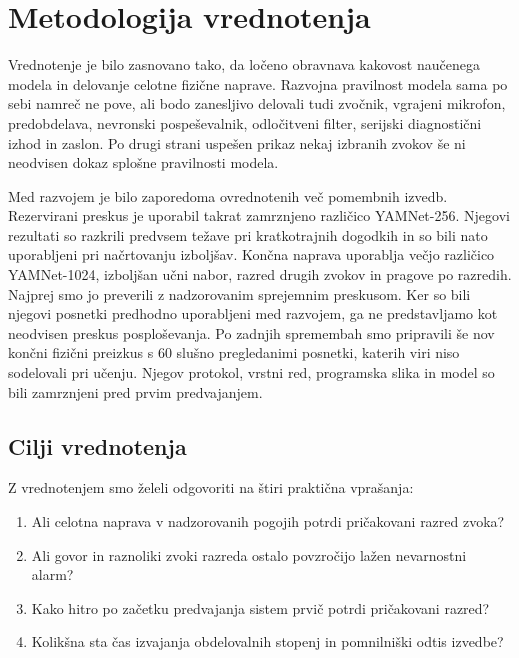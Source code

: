 \chapter{Metodologija vrednotenja}
\label{ch:metodologija}

Vrednotenje je bilo zasnovano tako, da ločeno obravnava kakovost naučenega
modela in delovanje celotne fizične naprave. Razvojna pravilnost modela sama po
sebi namreč ne pove, ali bodo zanesljivo delovali tudi zvočnik, vgrajeni
mikrofon, predobdelava, nevronski pospeševalnik, odločitveni filter, serijski
diagnostični izhod in zaslon. Po drugi strani uspešen prikaz nekaj izbranih
zvokov še ni neodvisen dokaz splošne pravilnosti modela.

Med razvojem je bilo zaporedoma ovrednotenih več pomembnih izvedb. Rezervirani
preskus je uporabil takrat zamrznjeno različico YAMNet-256. Njegovi
rezultati so razkrili predvsem težave pri kratkotrajnih dogodkih in so bili nato
uporabljeni pri načrtovanju izboljšav. Končna naprava uporablja večjo različico
YAMNet-1024, izboljšan učni nabor, razred drugih zvokov in pragove po razredih.
Najprej smo jo preverili z nadzorovanim sprejemnim preskusom. Ker so bili
njegovi posnetki predhodno uporabljeni med razvojem, ga ne predstavljamo kot
neodvisen preskus posploševanja. Po zadnjih spremembah smo pripravili še nov
končni fizični preizkus s 60 slušno pregledanimi posnetki, katerih viri niso
sodelovali pri učenju. Njegov protokol, vrstni red, programska slika in model
so bili zamrznjeni pred prvim predvajanjem.

\section{Cilji vrednotenja}

Z vrednotenjem smo želeli odgovoriti na štiri praktična vprašanja:

\begin{enumerate}
  \item Ali celotna naprava v nadzorovanih pogojih potrdi pričakovani razred
        zvoka?
  \item Ali govor in raznoliki zvoki razreda ostalo povzročijo lažen
        nevarnostni alarm?
  \item Kako hitro po začetku predvajanja sistem prvič potrdi pričakovani
        razred?
  \item Kolikšna sta čas izvajanja obdelovalnih stopenj in pomnilniški odtis
        izvedbe?
\end{enumerate}

